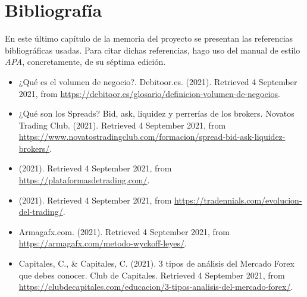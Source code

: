 \chapter{Bibliografía}

En este último capítulo de la memoria del proyecto se presentan las referencias bibliográficas usadas. Para citar dichas referencias, hago uso del manual de estilo \textit{APA}, concretamente, de su séptima edición.\newline

\begin{itemize}
\item ¿Qué es el volumen de negocio?. Debitoor.es. (2021). Retrieved 4 September 2021, from \href{https://debitoor.es/glosario/definicion-volumen-de-negocios}{https://debitoor.es/glosario/definicion-volumen-de-negocios}.\newline

\item ¿Qué son los Spreads? Bid, ask, liquidez y perrerías de los brokers. Novatos Trading Club. (2021). Retrieved 4 September 2021, from \\
\href{https://www.novatostradingclub.com/formacion/spread-bid-ask-liquidez-brokers/}{https://www.novatostradingclub.com/formacion/spread-bid-ask-liquidez-brokers/}.\newline

\item (2021). Retrieved 4 September 2021, from \href{https://plataformasdetrading.com/}{https://plataformasdetrading.com/}.\newline

\item (2021). Retrieved 4 September 2021, from \href{https://tradennials.com/evolucion-del-trading/}{https://tradennials.com/evolucion-del-trading/}.\newline

\item Armagafx.com. (2021). Retrieved 4 September 2021, from \href{https://armagafx.com/metodo-wyckoff-leyes/}{https://armagafx.com/metodo-wyckoff-leyes/}. \newline

\item Capitales, C., \& Capitales, C. (2021). 3 tipos de análisis del Mercado Forex que debes conocer. Club de Capitales. Retrieved 4 September 2021, from \href{https://clubdecapitales.com/educacion/3-tipos-analisis-del-mercado-forex/}{https://clubdecapitales.com/educacion/3-tipos-analisis-del-mercado-forex/}.\newline


\end{itemize}
